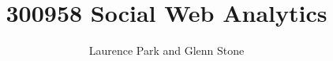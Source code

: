 



\renewcommand{\subsubsection}[1]{\paragraph{#1}}

\usepackage{fancyvrb}
\usepackage{xspace}
\usepackage{fullwidth}


\newcommand{\openepigraph}[2]{%
  \begin{fullwidth}
  \sffamily\large
  \begin{doublespace}
  \noindent\allcaps{#1}\\%
  \noindent\allcaps{#2}%
  \end{doublespace}
  \end{fullwidth}
}

\newcommand{\blankpage}{\newpage\hbox{}\thispagestyle{empty}\newpage}

\newcommand{\monthyear}{%
  \ifcase\month\or January\or February\or March\or April\or May\or June\or
  July\or August\or September\or October\or November\or
  December\fi\space\number\year
}

\usepackage{units}

\title{300958 Social Web Analytics}
\author{Laurence Park and Glenn Stone}




\frontmatter

\thispagestyle{empty}
\maketitle


\newpage
\thispagestyle{empty}
~

\vfill

